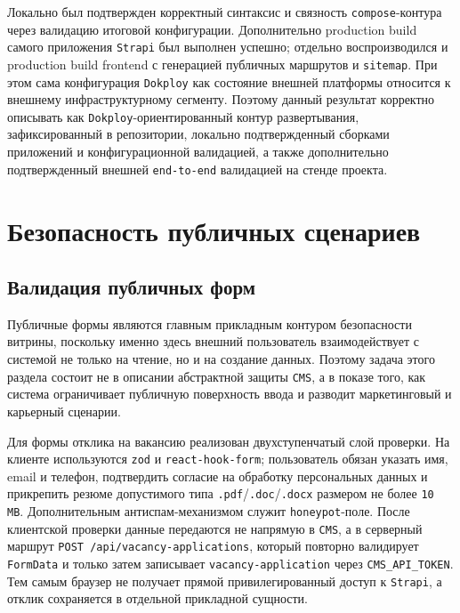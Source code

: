 Локально был подтвержден корректный синтаксис и связность \texttt{compose}-контура через
валидацию итоговой конфигурации. Дополнительно production build самого приложения
\texttt{Strapi} был выполнен успешно; отдельно воспроизводился и production build
frontend с генерацией публичных маршрутов и \texttt{sitemap}. При этом сама
конфигурация \texttt{Dokploy} как состояние внешней платформы относится к внешнему
инфраструктурному сегменту. Поэтому
данный результат корректно описывать как \texttt{Dokploy}-ориентированный
контур развертывания, зафиксированный в репозитории, локально подтвержденный сборками
приложений и конфигурационной валидацией, а также дополнительно подтвержденный внешней
\texttt{end-to-end} валидацией на стенде проекта.

\section{Безопасность публичных сценариев}

\subsection{Валидация публичных форм}

Публичные формы являются главным прикладным контуром безопасности витрины, поскольку именно
здесь внешний пользователь взаимодействует с системой не только на чтение, но и на
создание данных. Поэтому задача этого раздела состоит не в описании абстрактной защиты
\texttt{CMS}, а в показе того, как система ограничивает публичную поверхность ввода и
разводит маркетинговый и карьерный сценарии.

Для формы отклика на вакансию реализован двухступенчатый слой проверки. На клиенте
используются \texttt{zod} и \texttt{react-hook-form}; пользователь обязан указать имя,
email и телефон, подтвердить согласие на обработку персональных данных и прикрепить
резюме допустимого типа \texttt{.pdf}/\texttt{.doc}/\texttt{.docx} размером не более
\texttt{10 MB}. Дополнительным антиспам-механизмом служит \texttt{honeypot}-поле. После
клиентской проверки данные передаются не напрямую в \texttt{CMS}, а в серверный
маршрут \texttt{POST /api/vacancy-applications}, который повторно валидирует
\texttt{FormData} и только затем записывает \texttt{vacancy-application} через
\texttt{CMS\_API\_TOKEN}. Тем самым браузер не получает прямой привилегированный доступ
к \texttt{Strapi}, а отклик сохраняется в отдельной прикладной сущности.

